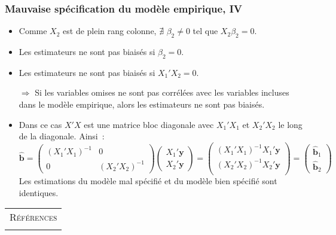 \documentclass[10pt]{beamer}
\theoremstyle{plain}
\begin{document}
\begin{frame}
  \frametitle{Mauvaise spécification du modèle empirique, IV}

  \begin{itemize}

  \item Comme $X_2$ est de plein rang colonne, $\nexists$ $\beta_2\neq 0$ tel que $X_2\beta_2=0$.\newline

  \item Les estimateurs ne sont pas biaisés si $\beta_2=0$.\newline

  \item Les estimateurs ne sont pas biaisés si $X_1'X_2 = 0$.\newline

  \item[$\Rightarrow$] Si les variables omises ne sont pas corrélées avec les variables incluses dans le modèle empirique, alors les estimateurs ne sont pas biaisés.\newline

  \item Dans ce cas $X'X$ est une matrice bloc diagonale avec $X_1'X_1$ et $X_2'X_2$ le long de la diagonale. Ainsi~:
    \[
      \hat{\mathbf b} =
      \begin{pmatrix}
        (X_1'X_1)^{-1} & 0 \\
        0 & (X_2'X_2)^{-1}
      \end{pmatrix}
      \begin{pmatrix}
        X_1'\mathbf y\\
        X_2'\mathbf y
      \end{pmatrix}
      =
      \begin{pmatrix}
        (X_1'X_1)^{-1}X_1'\mathbf y\\
        (X_2'X_2)^{-1}X_2'\mathbf y\\
      \end{pmatrix}
      =
      \begin{pmatrix}
        \hat{\mathbf b}_1\\
        \hat{\mathbf b}_2
      \end{pmatrix}
    \]
    Les estimations du modèle mal spécifié et du modèle bien spécifié sont identiques.
  \end{itemize}


\end{frame}


\begin{notes}

  \begin{center}
    \begin{tabular}{c}
      \\
      \Huge{\textsc{Références}}\\
      \\
    \end{tabular}
  \end{center}

  \bigskip

  \nocite{Green2017}

  \nocite{Schmidt1976}

  \printbibliography

\end{notes}
\end{document}
